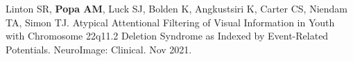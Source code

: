\documentclass[line,margin,10pt]{res}
\begin{document}
\begin{resume}
Linton SR, \textbf{Popa AM}, Luck SJ, Bolden K, Angkustsiri K, Carter CS, Niendam TA, Simon TJ. Atypical Attentional Filtering of Visual Information in Youth with Chromosome 22q11.2 Deletion Syndrome as Indexed by Event-Related Potentials. NeuroImage: Clinical. Nov 2021.



%

\end{resume}
\end{document}
